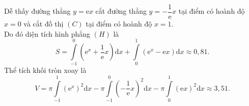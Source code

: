 \begin{ex}
{\begin{itemchoice}
			\itemch 
			Dễ thấy đường thẳng $y=\mathrm{e}x$ cắt đường thẳng $y=-\dfrac{1}{\mathrm{e}}x$ tại điểm có hoành độ $x=0$ và cắt đồ thị $(C)$ tại điểm có hoành độ $x=1$.\\
			Do đó diện tích hình phẳng $(H)$ là
			$$S=\displaystyle\int\limits_{-1}^0\left(\mathrm{e}^x+\dfrac{1}{\mathrm{e}}x\right)\mathrm{d}x+\displaystyle\int\limits_0^1\left(\mathrm{e}^x-\mathrm{e}x\right)\mathrm{d}x \approx 0{,}81.$$
			\itemch 
			Thể tích khối tròn xoay là
			$$V=\pi \displaystyle\int\limits_{-1}^1\left(\mathrm{e}^x \right)^2\mathrm{d}x-\pi \displaystyle\int\limits_{-1}^0\left(-\dfrac{1}{\mathrm{e}}x\right)^2\mathrm{d}x-\pi \displaystyle\int\limits_0^1(\mathrm{e}x)^2\mathrm{d}x \approx 3{,}51.$$
		\end{itemchoice}
	}
\end{ex}


